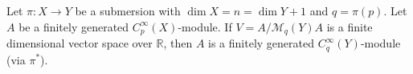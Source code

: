 Let $\pi: X \to Y$ be a submersion with $\dim X = n = \dim Y + 1$ and $q = \pi(p)$. Let $A$ be a finitely generated $C_p^\infty(X)$-module. If $V = A / \mathcal{M}_q(Y)A$ is a finite dimensional vector space over $\mathbb{R}$, then $A$ is a finitely generated $C_q^\infty(Y)$-module (via $\pi^*$).

